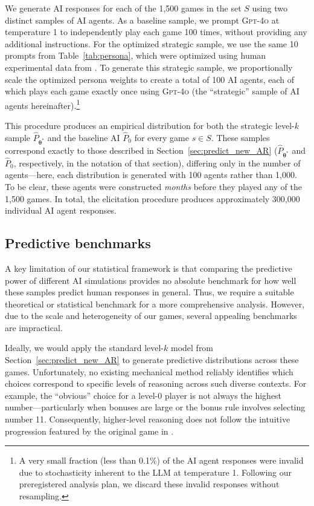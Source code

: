 \documentclass[11pt]{article}
\theoremstyle{definition}
\newcommand{\aisub}{AI agent}
\newcommand{\persona}{prompt}
\newcommand{\NGamesS}{1,500}
\begin{document}
We generate AI responses for each of the \NGamesS{} games in the set $S$ using two distinct samples of \aisub{s}. 
As a baseline sample, we prompt \textsc{Gpt-4o} at temperature 1 to independently play each game 100 times, without providing any additional instructions. 
For the optimized strategic sample, we use the same 10 \persona{s} from Table~\ref{tab:persona}, which were optimized using human experimental data from \citeauthor{1120Arad2012}. 
To generate this strategic sample, we proportionally scale the optimized persona weights to create a total of 100 \aisub{s}, each of which plays each game exactly once using \textsc{Gpt-4o} (the ``strategic'' sample of \aisub{s} hereinafter).\footnote{A very small fraction (less than 0.1\%) of the \aisub{} responses were invalid due to stochasticity inherent to the LLM at temperature 1. Following our preregistered analysis plan, we discard these invalid responses without resampling.}

This procedure produces an empirical distribution for both the strategic level-$k$ sample $\hat P_{\bm\theta^*}$ and the baseline AI $\hat P_{0}$ for every game $s \in S$.
These samples correspond exactly to those described in Section~\ref{sec:predict_new_AR} ($\hat P_{\bm\theta^*}$ and $\hat P_{0}$, respectively, in the notation of that section), differing only in the number of agents---here, each distribution is generated with 100 agents rather than 1,000.
To be clear, these agents were constructed \emph{months} before they played any of the \NGamesS{} games.
In total, the elicitation procedure produces approximately 300,000 individual \aisub{} responses.

\subsection{Predictive benchmarks}
\label{sec:nash-selector}

A key limitation of our statistical framework is that comparing the predictive power of different AI simulations provides no absolute benchmark for how well these samples predict human responses in general. 
Thus, we require a suitable theoretical or statistical benchmark for a more comprehensive analysis.
However, due to the scale and heterogeneity of our games, several appealing benchmarks are impractical.

Ideally, we would apply the standard level-$k$ model from Section~\ref{sec:predict_new_AR} to generate predictive distributions across these games. 
Unfortunately, no existing mechanical method reliably identifies which choices correspond to specific levels of reasoning across such diverse contexts. 
For example, the ``obvious'' choice for a level-$0$ player is not always the highest number---particularly when bonuses are large or the bonus rule involves selecting number 11. 
Consequently, higher-level reasoning does not follow the intuitive progression featured by the original game in \citeauthor{1120Arad2012}.
\end{document}
